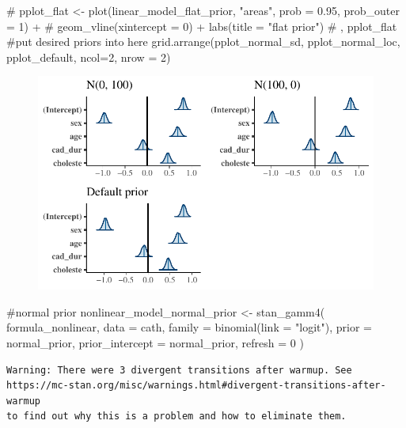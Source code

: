 \documentclass[
  letterpaper,
  DIV=11,
  numbers=noendperiod]{scrartcl}
\newenvironment{Shaded}{\begin{snugshade}}{\end{snugshade}}
\newcommand{\AttributeTok}[1]{\textcolor[rgb]{0.40,0.45,0.13}{#1}}
\newcommand{\CommentTok}[1]{\textcolor[rgb]{0.37,0.37,0.37}{#1}}
\newcommand{\DecValTok}[1]{\textcolor[rgb]{0.68,0.00,0.00}{#1}}
\newcommand{\FunctionTok}[1]{\textcolor[rgb]{0.28,0.35,0.67}{#1}}
\newcommand{\NormalTok}[1]{\textcolor[rgb]{0.00,0.23,0.31}{#1}}
\newcommand{\OtherTok}[1]{\textcolor[rgb]{0.00,0.23,0.31}{#1}}
\newcommand{\StringTok}[1]{\textcolor[rgb]{0.13,0.47,0.30}{#1}}
\begin{document}
\begin{Shaded}
\begin{Highlighting}[]
\CommentTok{\# pplot\_flat \textless{}{-} plot(linear\_model\_flat\_prior, "areas", prob = 0.95, prob\_outer = 1) + }
  \CommentTok{\# geom\_vline(xintercept = 0) + labs(title = "flat prior")}
\CommentTok{\# , pplot\_flat}
\CommentTok{\#put desired priors into here}
\FunctionTok{grid.arrange}\NormalTok{(pplot\_normal\_sd, pplot\_normal\_loc, pplot\_default, }\AttributeTok{ncol=}\DecValTok{2}\NormalTok{, }\AttributeTok{nrow =} \DecValTok{2}\NormalTok{) }
\end{Highlighting}
\end{Shaded}

\begin{figure}[H]

{\centering \includegraphics{project_final_files/figure-pdf/unnamed-chunk-22-1.pdf}

}

\end{figure}

\begin{Shaded}
\begin{Highlighting}[]
\CommentTok{\#normal prior}
\NormalTok{nonlinear\_model\_normal\_prior }\OtherTok{\textless{}{-}} \FunctionTok{stan\_gamm4}\NormalTok{(}
\NormalTok{  formula\_nonlinear, }\AttributeTok{data =}\NormalTok{ cath,}
  \AttributeTok{family =} \FunctionTok{binomial}\NormalTok{(}\AttributeTok{link =} \StringTok{"logit"}\NormalTok{),}
  \AttributeTok{prior =}\NormalTok{ normal\_prior, }\AttributeTok{prior\_intercept =}\NormalTok{ normal\_prior,}
  \AttributeTok{refresh =} \DecValTok{0}
\NormalTok{)}
\end{Highlighting}
\end{Shaded}

\begin{verbatim}
Warning: There were 3 divergent transitions after warmup. See
https://mc-stan.org/misc/warnings.html#divergent-transitions-after-warmup
to find out why this is a problem and how to eliminate them.
\end{verbatim}
\end{document}
